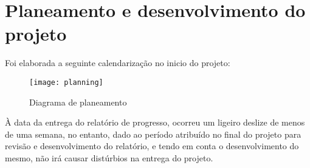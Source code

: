 \section{Planeamento e desenvolvimento do projeto} 
Foi elaborada a seguinte calendarização no inicio do projeto:

\begin{figure}[h]
	\centering
	\texttt{[image: planning]}
	\caption{Diagrama de planeamento}
\end{figure}

À data da entrega do relatório de progresso, ocorreu um ligeiro deslize de menos de uma semana, no entanto, dado ao período atribuído no final do projeto para revisão e desenvolvimento do relatório, e tendo em conta o desenvolvimento do mesmo, não irá causar distúrbios na entrega do projeto.